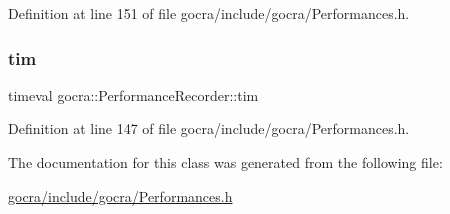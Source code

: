 Definition at line 151 of file gocra/include/gocra/\+Performances.\+h.

\hypertarget{classgocra_1_1PerformanceRecorder_ab953e4252c10603dc8c25634f471db5a}{}\label{classgocra_1_1PerformanceRecorder_ab953e4252c10603dc8c25634f471db5a} 
\subsubsection{\texorpdfstring{tim}{tim}}
{\footnotesize\ttfamily timeval gocra\+::\+Performance\+Recorder\+::tim\hspace{0.3cm}{\ttfamily [protected]}}



Definition at line 147 of file gocra/include/gocra/\+Performances.\+h.



The documentation for this class was generated from the following file\+:\begin{DoxyCompactItemize}
\item 
\hyperlink{gocra_2include_2gocra_2Performances_8h}{gocra/include/gocra/\+Performances.\+h}\end{DoxyCompactItemize}
